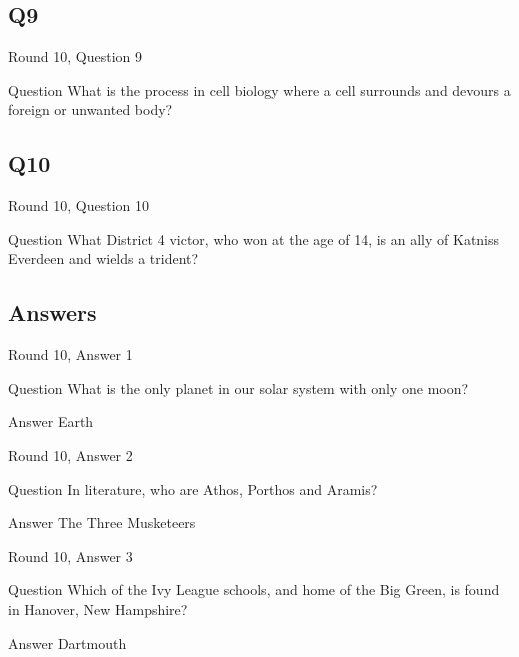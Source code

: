 \documentclass[11pt]{beamer}
\begin{document}
\subsection*{Q9}
\begin{frame}[t]{Round 10, Question 9}
\vspace{2em}
\begin{block}{Question}
What is the process in cell biology where a cell surrounds and devours a foreign or unwanted body\@?
\end{block}
\end{frame}
    

\subsection*{Q10}
\begin{frame}[t]{Round 10, Question 10}
\vspace{2em}
\begin{block}{Question}
What District 4 victor, who won at the age of 14, is an ally of Katniss Everdeen and wields a trident\@?
\end{block}
\end{frame}
    
\subsection{Answers}

\begin{frame}[t]{Round 10, Answer 1}
\vspace{2em}
\begin{block}{Question}
What is the only planet in our solar system with only one moon\@?
\end{block}
\pause{}
\begin{block}{Answer}
Earth
\end{block}
\end{frame}
    

\begin{frame}[t]{Round 10, Answer 2}
\vspace{2em}
\begin{block}{Question}
In literature, who are Athos, Porthos and Aramis\@?
\end{block}
\pause{}
\begin{block}{Answer}
The Three Musketeers
\end{block}
\end{frame}
    

\begin{frame}[t]{Round 10, Answer 3}
\vspace{2em}
\begin{block}{Question}
Which of the Ivy League schools, and home of the Big Green, is found in Hanover, New Hampshire\@?
\end{block}
\pause{}
\begin{block}{Answer}
Dartmouth
\end{block}
\end{frame}
    
\end{document}
